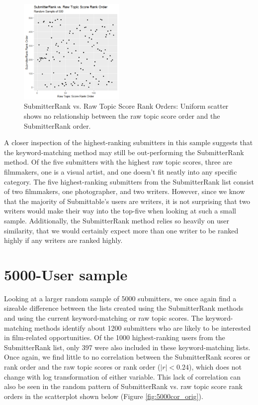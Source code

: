 \documentclass[12pt]{report}   %
\begin{document}
\begin{figure}[h]
    \centering
    \begin{minipage}{0.9\textwidth}
	\captionsetup{font=scriptsize}
        \centering
        \includegraphics[width=0.45\textwidth]{rankOrder500_orig.png} %
        \caption{SubmitterRank vs. Raw Topic Score Rank Orders: Uniform scatter shows no relationship between the raw topic score order and the SubmitterRank order.}
	  \label{fig:500cor_orig}
    \end{minipage}
 \end{figure}

A closer inspection of the highest-ranking submitters in this sample suggests that the keyword-matching method may still be out-performing the SubmitterRank method. Of the five submitters with the highest raw topic scores, three are filmmakers, one is a visual artist, and one doesn't fit neatly into any specific category. The five highest-ranking submitters from the SubmitterRank list consist of two filmmakers, one photographer, and two writers. However, since we know that the majority of Submittable's users are writers, it is not surprising that two writers would make their way into the top-five when looking at such a small sample. Additionally, the SubmitterRank method relies so heavily on user similarity, that we would certainly expect more than one writer to be ranked highly if any writers are ranked highly.

\section{5000-User sample}

Looking at a larger random sample of 5000 submitters, we once again find a sizeable difference between the lists created using the SubmitterRank methods and using the current keyword-matching or raw topic scores. The keyword-matching methods identify about 1200 submitters who are likely to be interested in film-related opportunities. Of the 1000 highest-ranking users from the SubmitterRank list, only 397 were also included in these keyword-matching lists. Once again, we find little to no correlation between the SubmitterRank scores or rank order and the raw topic scores or rank order ($|r|<0.24$), which does not change with log transformation of either variable. This lack of correlation can also be seen in the random pattern of SubmitterRank vs. raw topic score rank orders in the scatterplot shown below (Figure \ref{fig:5000cor_orig}).
\end{document}

